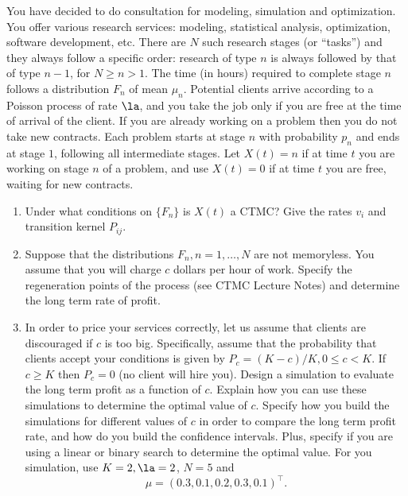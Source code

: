 \documentclass[12pt]{article}
\begin{document}


\begin{problem} 
You have decided to do consultation for modeling, simulation and
optimization. You offer various research  services: modeling,
statistical analysis, optimization, software development, etc. There are
$N$ such research stages (or ``tasks'') and they always follow a
specific order: research of type  $n$ is always followed  by that of
type $n-1$, for $N\ge n > 1$. The time (in hours) required to complete
stage $n$ follows a distribution $F_n$ of mean $\mu_n$. Potential
clients arrive according to a Poisson process of rate $\la$, and you
take the job only if you are free at the time of arrival of the client.
If you are already working on a problem then you do not take new
contracts. Each problem starts at stage $n$ with probability $p_n$ and
ends at stage $1$, following all intermediate stages. Let $X(t)=n$ if at
time $t$ you are working on stage $n$ of a problem, and use $X(t)=0$ if
at time $t$ you are free, waiting for new contracts. 
\begin{enumerate}
\item {} Under what conditions on $\{F_n\}$ is $X(t)$ a CTMC?
    Give the rates $v_i$ and transition kernel $P_{ij}$.
\item {} Suppose that the distributions $F_n, n=1,\ldots , N$
    are not memoryless. You assume that you will charge $c$ dollars per
    hour of work. Specify the regeneration points of the process (see
    CTMC Lecture Notes) and determine the long term rate of profit. 
\item {} In order to price your services correctly, let us
    assume that clients are discouraged if $c$ is too big. Specifically,
    assume that the probability that clients accept your conditions is
    given by $P_c=(K-c)/K, 0\le c <K$. If $c\ge K$ then $P_c=0$ (no
    client will hire you). %
Design a simulation to evaluate the long term profit as a function of
$c$. Explain how you can use these simulations to determine the optimal
value of $c$. Specify how you build the simulations for different
values of $c$ in order to compare the long term profit rate, and how do
you build the confidence intervals. Plus, specify if you are using a
linear or binary search to determine the optimal value. For you
simulation, use $K=2, \la=2$, $N=5$ and 
\[
    \mu= (0.3,  0.1, 0.2, 0.3, 0.1)^\top.
\]

\end{enumerate}

\end{problem}


\end{document}
